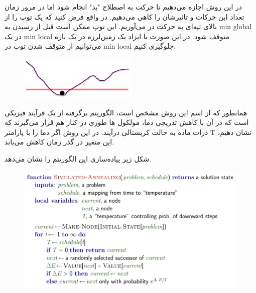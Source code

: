 \begin{flushright}
    در این روش اجازه می‌دهیم تا حرکت به اصطلاح "بد" انجام شود اما در مرور زمان تعداد این حرکات و تاثیرشان را کاهی می‌دهیم.
    در واقع فرض کنید که یک توپ را از بالای تپه‌ای به حرکت در می‌آوریم.
    این توپ ممکن است قبل از رسیدن به min global در یک min local متوقف شود.
    در این صورت با ایزاد یک زمین‌لرزه در یک بازه می‌توانیم از متوقف شدن توپ در min local جلوگیری کنیم.
    \begin{figure}[H]
        \centering
        \includegraphics[width=0.5\textwidth]{source/ball.png}
        \label{fig:ball}
    \end{figure}

    همانطور که از اسم این روش مشخص است، الگوریتم برگرفته از یک فرآیند فیزیکی است که در آن با کاهش تدریجی دما، مولکول ها طوری در کنار هم قرار می‌گیرند که ذرات ماده به حالت کریستالی درآیند.
    در این روش اگر دما را با پارامتر T نشان دهیم، این متغیر در گذر زمان کاهش می‌یابد.

    شکل زیر پیاده‌سازی این الگوریتم را نشان می‌دهد.

    \begin{figure}[H]
        \centering
        \includegraphics[width=\textwidth]{source/simulated-annealing.png}
        \label{fig:simulated-annealing}
    \end{figure}


\end{flushright}

